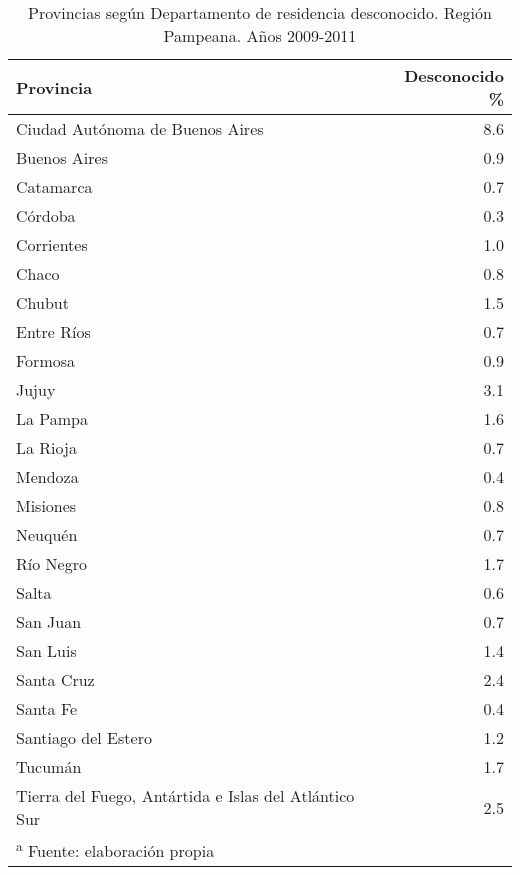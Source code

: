 \documentclass[12pt,spanish,]{article}
\begin{document}
\begin{landscape}\begin{table}

\caption{\label{tab:SinDEP}Provincias según Departamento de residencia desconocido. Región Pampeana. Años 2009-2011}
\centering
\begin{tabular}[t]{lr}
\toprule
Provincia & Desconocido \%\\
\midrule
Ciudad Autónoma de Buenos Aires & 8.6\\
Buenos Aires & 0.9\\
Catamarca & 0.7\\
Córdoba & 0.3\\
Corrientes & 1.0\\
\addlinespace
Chaco & 0.8\\
Chubut & 1.5\\
Entre Ríos & 0.7\\
Formosa & 0.9\\
Jujuy & 3.1\\
\addlinespace
La Pampa & 1.6\\
La Rioja & 0.7\\
Mendoza & 0.4\\
Misiones & 0.8\\
Neuquén & 0.7\\
\addlinespace
Río Negro & 1.7\\
Salta & 0.6\\
San Juan & 0.7\\
San Luis & 1.4\\
Santa Cruz & 2.4\\
\addlinespace
Santa Fe & 0.4\\
Santiago del Estero & 1.2\\
Tucumán & 1.7\\
Tierra del Fuego, Antártida e Islas del Atlántico Sur & 2.5\\
\bottomrule
\multicolumn{2}{l}{\textsuperscript{a} Fuente: elaboración propia}\\
\end{tabular}
\end{table}
\end{landscape}
\end{document}

